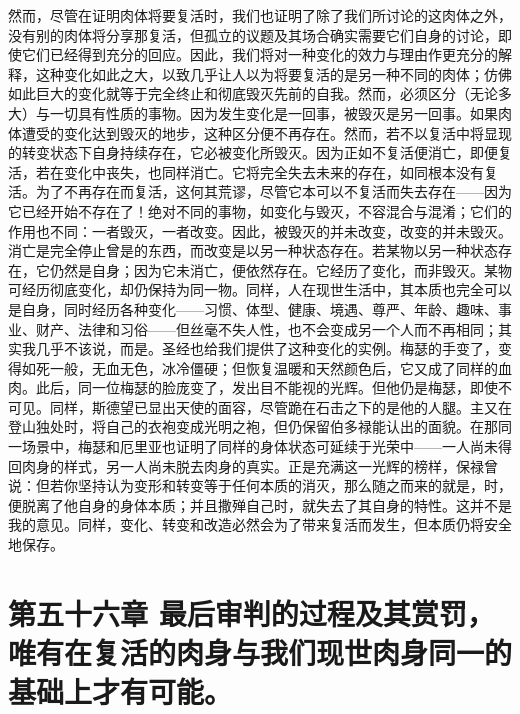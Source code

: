 然而，尽管在证明肉体将要复活时，我们也证明了除了我们所讨论的这肉体之外，没有别的肉体将分享那复活，但孤立的议题及其场合确实需要它们自身的讨论，即使它们已经得到充分的回应。因此，我们将对一种变化的效力与理由作更充分的解释，这种变化如此之大，以致几乎让人以为将要复活的是另一种不同的肉体；仿佛如此巨大的变化就等于完全终止和彻底毁灭先前的自我。然而，必须区分（无论多大）与一切具有性质的事物。因为发生变化是一回事，被毁灭是另一回事。如果肉体遭受的变化达到毁灭的地步，这种区分便不再存在。然而，若不以复活中将显现的转变状态下自身持续存在，它必被变化所毁灭。因为正如不复活便消亡，即便复活，若在变化中丧失，也同样消亡。它将完全失去未来的存在，如同根本没有复活。为了不再存在而复活，这何其荒谬，尽管它本可以不复活而失去存在——因为它已经开始不存在了！绝对不同的事物，如变化与毁灭，不容混合与混淆；它们的作用也不同：一者毁灭，一者改变。因此，被毁灭的并未改变，改变的并未毁灭。消亡是完全停止曾是的东西，而改变是以另一种状态存在。若某物以另一种状态存在，它仍然是自身；因为它未消亡，便依然存在。它经历了变化，而非毁灭。某物可经历彻底变化，却仍保持为同一物。同样，人在现世生活中，其本质也完全可以是自身，同时经历各种变化——习惯、体型、健康、境遇、尊严、年龄、趣味、事业、财产、法律和习俗——但丝毫不失人性，也不会变成另一个人而不再相同；其实我几乎不该说，而是。圣经也给我们提供了这种变化的实例。梅瑟的手变了，变得如死一般，无血无色，冰冷僵硬；但恢复温暖和天然颜色后，它又成了同样的血肉。此后，同一位梅瑟的脸庞变了，发出目不能视的光辉。但他仍是梅瑟，即使不可见。同样，斯德望已显出天使的面容，尽管跪在石击之下的是他的人腿。主又在登山独处时，将自己的衣袍变成光明之袍，但仍保留伯多禄能认出的面貌。在那同一场景中，梅瑟和厄里亚也证明了同样的身体状态可延续于光荣中——一人尚未得回肉身的样式，另一人尚未脱去肉身的真实。正是充满这一光辉的榜样，保禄曾说：但若你坚持认为变形和转变等于任何本质的消灭，那么随之而来的就是，时，便脱离了他自身的身体本质；并且撒殚自己时，就失去了其自身的特性。这并不是我的意见。同样，变化、转变和改造必然会为了带来复活而发生，但本质仍将安全地保存。\par


\section{第五十六章 最后审判的过程及其赏罚，唯有在复活的肉身与我们现世肉身同一的基础上才有可能。}

